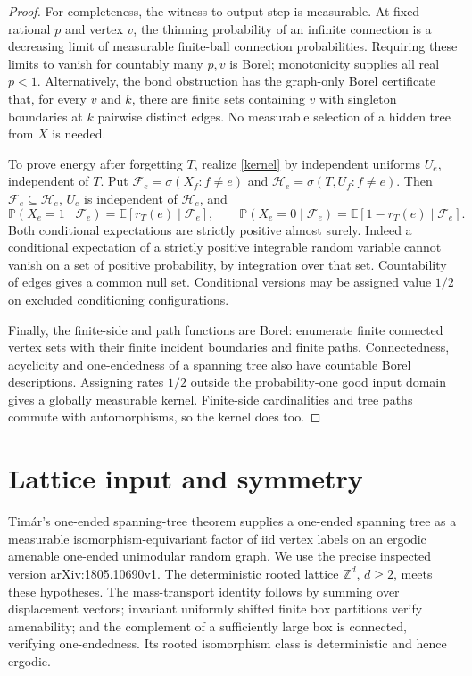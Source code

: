 \documentclass[11pt]{article}
\newcommand{\Z}{\mathbb Z}
\newcommand{\Pp}{\mathbb P}
\newcommand{\E}{\mathbb E}
\begin{document}
\begin{proof}
For completeness, the witness-to-output step is measurable. At fixed rational $p$ and vertex $v$, the thinning probability of an infinite connection is a decreasing limit of measurable finite-ball connection probabilities. Requiring these limits to vanish for countably many $p,v$ is Borel; monotonicity supplies all real $p<1$. Alternatively, the bond obstruction has the graph-only Borel certificate that, for every $v$ and $k$, there are finite sets containing $v$ with singleton boundaries at $k$ pairwise distinct edges. No measurable selection of a hidden tree from $X$ is needed.

To prove energy after forgetting $T$, realize \eqref{kernel} by independent uniforms $U_e$, independent of $T$. Put $\mathcal F_e=\sigma(X_f:f\ne e)$ and $\mathcal H_e=\sigma(T,U_f:f\ne e)$. Then $\mathcal F_e\subseteq\mathcal H_e$, $U_e$ is independent of $\mathcal H_e$, and
\begin{equation}\label{tower}
 \Pp(X_e=1\mid\mathcal F_e)=\E[r_T(e)\mid\mathcal F_e],\qquad
 \Pp(X_e=0\mid\mathcal F_e)=\E[1-r_T(e)\mid\mathcal F_e].
\end{equation}
Both conditional expectations are strictly positive almost surely. Indeed a conditional expectation of a strictly positive integrable random variable cannot vanish on a set of positive probability, by integration over that set. Countability of edges gives a common null set. Conditional versions may be assigned value $1/2$ on excluded conditioning configurations.

Finally, the finite-side and path functions are Borel: enumerate finite connected vertex sets with their finite incident boundaries and finite paths. Connectedness, acyclicity and one-endedness of a spanning tree also have countable Borel descriptions. Assigning rates $1/2$ outside the probability-one good input domain gives a globally measurable kernel. Finite-side cardinalities and tree paths commute with automorphisms, so the kernel does too.
\end{proof}

\section{Lattice input and symmetry}
Tim\'ar's one-ended spanning-tree theorem \cite[Theorem 1 and Corollary 2]{T} supplies a one-ended spanning tree as a measurable isomorphism-equivariant factor of iid vertex labels on an ergodic amenable one-ended unimodular random graph. We use the precise inspected version arXiv:1805.10690v1. The deterministic rooted lattice $\Z^d$, $d\ge2$, meets these hypotheses. The mass-transport identity follows by summing over displacement vectors; invariant uniformly shifted finite box partitions verify amenability; and the complement of a sufficiently large box is connected, verifying one-endedness. Its rooted isomorphism class is deterministic and hence ergodic.
\end{document}
